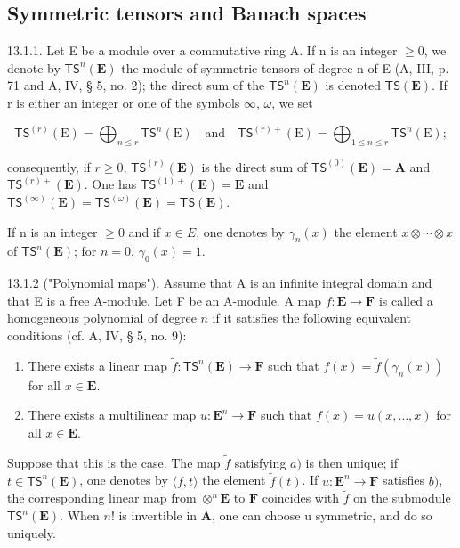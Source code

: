\subsection{Symmetric tensors and Banach spaces}

13.1.1. Let E be a module over a commutative ring A. If n is an integer \(\geqslant0\), we denote by \(\mathsf{TS}^{n}(\mathbf{E})\) the module of symmetric tensors of degree n of E (A, III, p. 71 and A, IV, § 5, no. 2); the direct sum of the \(\mathsf{TS}^{n}(\mathbf{E})\) is denoted \(\mathsf{TS}(\mathbf{E})\). If r is either an integer or one of the symbols \(\infty\), \(\omega\), we set

\[
\mathsf{TS}^{(r)}(\mathrm{E})=\bigoplus_{n\leqslant r}\mathsf{TS}^{n}(\mathrm{E})\quad\text{and}\quad\mathsf{TS}^{(r)+}(\mathrm{E})=\bigoplus_{1\leqslant n\leqslant r}\mathsf{TS}^{n}(\mathrm{E});
\]

consequently, if \(r \geqslant 0\), \(\mathsf{TS}^{(r)}(\mathbf{E})\) is the direct sum of \(\mathsf{TS}^{(0)}(\mathbf{E}) = \mathbf{A}\) and \(\mathsf{TS}^{(r)+}(\mathbf{E})\). One has \(\mathsf{TS}^{(1)+}(\mathbf{E}) = \mathbf{E}\) and \(\mathsf{TS}^{(\infty)}(\mathbf{E}) = \mathsf{TS}^{(\omega)}(\mathbf{E}) = \mathsf{TS}(\mathbf{E})\).

If n is an integer \(\geqslant0\) and if \(x\in E\), one denotes by \(\gamma_{n}(x)\) the element \(x\otimes\cdots\otimes x\) of \(\mathsf{TS}^{n}(\mathbf{E})\); for \(n=0\), \(\gamma_{0}(x)=1\).

13.1.2 ("Polynomial maps"). Assume that A is an infinite integral domain and that E is a free A-module. Let F be an A-module. A map \(f\colon\mathbf{E}\to\mathbf{F}\) is called a homogeneous polynomial of degree \(n\) if it satisfies the following equivalent conditions (cf. A, IV, § 5, no. 9):

\begin{enumerate}
\def\labelenumi{\alph{enumi})}
\item
  There exists a linear map \(\tilde{f}\colon\mathsf{TS}^{n}(\mathbf{E})\to\mathbf{F}\) such that \(f(x)=\tilde{f}(\gamma_{n}(x))\) for all \(x\in\mathbf{E}\).
\item
  There exists a multilinear map \(u: \mathbf{E}^{n} \to \mathbf{F}\) such that \(f(x) = u(x, \ldots, x)\) for all \(x \in \mathbf{E}\).
\end{enumerate}

Suppose that this is the case. The map \(\tilde{f}\) satisfying \(a)\) is then unique; if \(t \in \mathsf{TS}^n(\mathbf{E})\), one denotes by \(\langle f, t \rangle\) the element \(\tilde{f}(t)\). If \(u: \mathbf{E}^n \to \mathbf{F}\) satisfies \(b)\), the corresponding linear map from \(\otimes^n\mathbf{E}\) to \(\mathbf{F}\) coincides with \(\tilde{f}\) on the submodule \(\mathsf{TS}^n(\mathbf{E})\). When \(n!\) is invertible in \(\mathbf{A}\), one can choose u symmetric, and do so uniquely.

